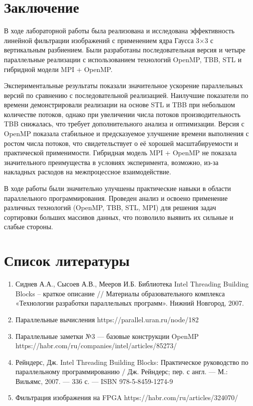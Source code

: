 \documentclass[12pt]{article}
\begin{document}
\section*{Заключение}

В ходе лабораторной работы была реализована и исследована эффективность линейной фильтрации изображений с применением ядра Гаусса 3×3 с вертикальным разбиением. Были разработаны последовательная версия и четыре параллельные реализации с использованием технологий OpenMP, TBB, STL и гибридной модели MPI + OpenMP.

Экспериментальные результаты показали значительное ускорение параллельных версий по сравнению с последовательной реализацией. Наилучшие показатели по времени демонстрировали реализации на основе STL и TBB при небольшом количестве потоков, однако при увеличении числа потоков производительность TBB снижалась, что требует дополнительного анализа и оптимизации. Версия с OpenMP показала стабильное и предсказуемое улучшение времени выполнения с ростом числа потоков, что свидетельствует о её хорошей масштабируемости и практической применимости. Гибридная модель MPI + OpenMP не показала значительного преимущества в условиях эксперимента, возможно, из-за накладных расходов на межпроцессное взаимодействие.

В ходе работы были значительно улучшены практические навыки в области параллельного программирования. Проведен анализ и освоено применение различных технологий (OpenMP, TBB, STL, MPI) для решения задач сортировки больших массивов данных, что позволило выявить их сильные и слабые стороны.

\section*{Список литературы}
\begin{enumerate}
    \item Сиднев А.А., Сысоев А.В., Мееров И.Б. Библиотека Intel Threading Building Blocks – краткое описание // Материалы образовательного комплекса «Технологии разработки параллельных программ». Нижний Новгород, 2007.
    \item Параллельные вычисления https://parallel.uran.ru/node/182
    \item Параллельные заметки №3 — базовые конструкции OpenMP https://habr.com/ru/companies/intel/articles/85273/
    \item Рейндерс, Дж. Intel Threading Building Blocks: Практическое руководство по параллельному программированию / Дж. Рейндерс; пер. с англ. — М.: Вильямс, 2007. — 336 с. — ISBN 978-5-8459-1274-9
   \item Фильтрация изображения на FPGA https://habr.com/ru/articles/324070/

\end{enumerate}
\newpage
\end{document}
